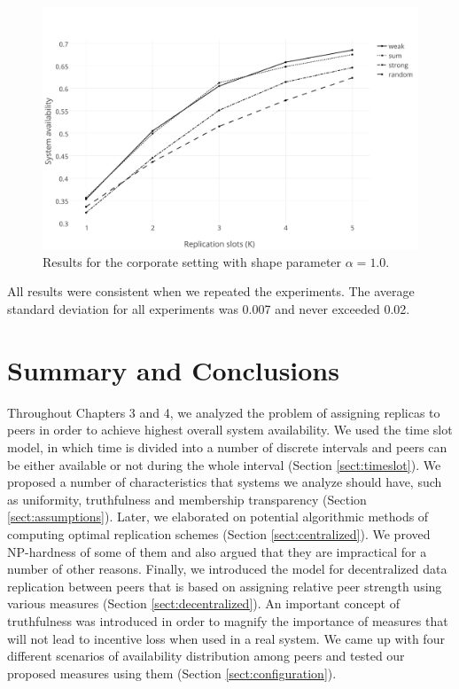 \documentclass{pracamgren}
\begin{document}
\begin{figure}[h]
\centering
\includegraphics[scale=0.5]{graphs/corp_alpha_1.pdf}
\caption{Results for the corporate setting with shape parameter $\alpha=1.0$.}
\label{corp_alpha_1}
\end{figure}

All results were consistent when we repeated the experiments. The average standard deviation for all experiments was 0.007 and never exceeded 0.02.\\

\chapter{Summary and Conclusions}\label{chap:conclusions}

Throughout Chapters 3 and 4, we analyzed the problem of assigning replicas to peers in order to achieve highest overall system availability. We used the time slot model, in which time is divided into a number of discrete intervals and peers can be either available or not during the whole interval (Section \ref{sect:timeslot}). We proposed a number of characteristics that systems we analyze should have, such as uniformity, truthfulness and membership transparency (Section \ref{sect:assumptions}). Later, we elaborated on potential algorithmic methods of computing optimal replication schemes  (Section \ref{sect:centralized}). We proved NP-hardness of some of them and also argued that they are impractical for a number of other reasons. Finally, we introduced the model for decentralized data replication between peers that is based on assigning relative peer strength using various measures (Section \ref{sect:decentralized}). An important concept of truthfulness was introduced in order to magnify the importance of measures that will not lead to incentive loss when used in a real system. We came up with four different scenarios of availability distribution among peers and tested our proposed measures using them (Section \ref{sect:configuration}).\\
\end{document}
